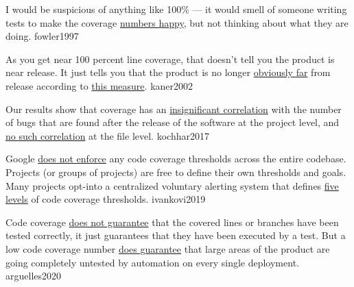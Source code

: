 \documentclass{article}
\begin{document}
  {I would be suspicious of anything like 100\% --- it would smell of someone writing tests to make the coverage \ul{numbers happy}, but not thinking about what they are doing.}
  {fowler1997}

  {As you get near 100 percent line coverage, that doesn't tell you the product is near release. It just tells you that the product is no longer \ul{obviously far} from release according to \ul{this measure}.}
  {kaner2002}

  {Our results show that coverage has an \ul{insignificant correlation} with the number of bugs that are found after the release of the software at the project level, and \ul{no such correlation} at the file level.}
  {kochhar2017}

  {Google \ul{does not enforce} any code coverage thresholds across the entire codebase. Projects (or groups of projects) are free to define their own thresholds and goals. Many projects opt-into a centralized voluntary alerting system that defines \ul{five levels} of code coverage thresholds.}
  {ivankovi2019}



  {Code coverage \ul{does not guarantee} that the covered lines or branches have been tested correctly, it just guarantees that they have been executed by a test. But a low code coverage number \ul{does guarantee} that large areas of the product are going completely untested by automation on every single deployment.}
  {arguelles2020}
\end{document}
